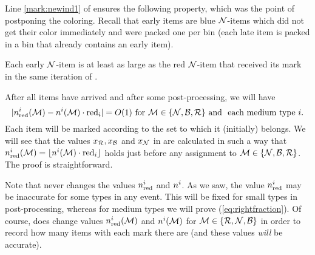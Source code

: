 Line \ref{mark:newind1} of {\MarkItems} ensures the following property, which was the point of postponing the coloring.
Recall that early items are blue $\mathcal{N}$-items which did not get their color immediately and were
packed one per bin (each late item is packed in a bin that already contains an early item).

\begin{aproperty}
	\label{prop:first}
	Each early $\mathcal{N}$-item is at least as large as the red $\mathcal{N}$-item that
	received its mark in the same iteration of \MarkItems.
\end{aproperty}

After all items have arrived and after some post-processing, we will have \begin{equation}
\label{eq:rightfraction}
|n_{\mathrm{red}}^i(\mathcal{M}) - n^i(\mathcal{M})\cdot \mathrm{red}_i |  = O(1)\mbox{ for }\mathcal{M}\in\{\mathcal{N}, \mathcal{B}, \mathcal{R}\}\mbox{ and }
\mbox{ each medium type }i.
\end{equation}
Each item will be marked according to the set to which it (initially) belongs.
We will see that the values $x_{\mathcal{R}}, x_{\mathcal{B}}$ and $x_{\mathcal{N}}$ in {\MarkItems} are calculated in such a way that
$n_{\mathrm{red}}^i(\mathcal{M}) = \lfloor n^i(\mathcal{M})\cdot \mathrm{red}_i \rfloor$ holds just before any assignment
to $\mathcal{M}\in\{\mathcal{N}, \mathcal{B}, \mathcal{R}\}$.
The proof is straightforward. 

Note that {\MarkItems} never changes the values $n_{\mathrm{red}}^i$ and $n^i$.
As we saw, the value $n_{\mathrm{red}}^i$ may be inaccurate for some types in any event.
This will be fixed for small types in post-processing, whereas for medium types we will prove (\ref{eq:rightfraction}).
Of course, {\MarkItems} does change values
$n_{\mathrm{red}}^i(\mathcal{M})$ and $n^i(\mathcal{M})$ for $\mathcal{M}\in\{\mathcal{R},\mathcal{N},\mathcal{B}\}$ in order to record how many
items with each mark there are (and these values \emph{will} be accurate).  






